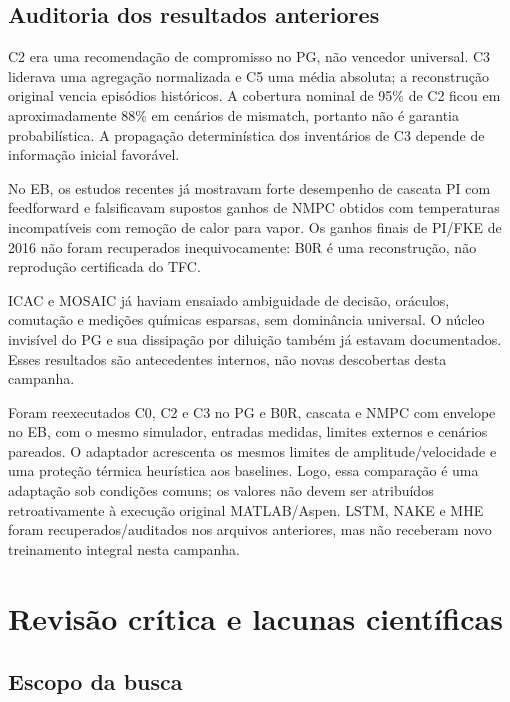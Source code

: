 \documentclass[
  11pt,
  letterpaper,
]{article}
\begin{document}
\hypertarget{auditoria-dos-resultados-anteriores}{%
\subsection{Auditoria dos resultados
anteriores}\label{auditoria-dos-resultados-anteriores}}

C2 era uma recomendação de compromisso no PG, não vencedor universal. C3
liderava uma agregação normalizada e C5 uma média absoluta; a
reconstrução original vencia episódios históricos. A cobertura nominal
de 95\% de C2 ficou em aproximadamente 88\% em cenários de mismatch,
portanto não é garantia probabilística. A propagação determinística dos
inventários de C3 depende de informação inicial favorável.

No EB, os estudos recentes já mostravam forte desempenho de cascata PI
com feedforward e falsificavam supostos ganhos de NMPC obtidos com
temperaturas incompatíveis com remoção de calor para vapor. Os ganhos
finais de PI/FKE de 2016 não foram recuperados inequivocamente: B0R é
uma reconstrução, não reprodução certificada do TFC.

ICAC e MOSAIC já haviam ensaiado ambiguidade de decisão, oráculos,
comutação e medições químicas esparsas, sem dominância universal. O
núcleo invisível do PG e sua dissipação por diluição também já estavam
documentados. Esses resultados são antecedentes internos, não novas
descobertas desta campanha.

Foram reexecutados C0, C2 e C3 no PG e B0R, cascata e NMPC com envelope
no EB, com o mesmo simulador, entradas medidas, limites externos e
cenários pareados. O adaptador acrescenta os mesmos limites de
amplitude/velocidade e uma proteção térmica heurística aos baselines.
Logo, essa comparação é uma adaptação sob condições comuns; os valores
não devem ser atribuídos retroativamente à execução original
MATLAB/Aspen. LSTM, NAKE e MHE foram recuperados/auditados nos arquivos
anteriores, mas não receberam novo treinamento integral nesta campanha.

\hypertarget{revisuxe3o-cruxedtica-e-lacunas-cientuxedficas}{%
\section{Revisão crítica e lacunas
científicas}\label{revisuxe3o-cruxedtica-e-lacunas-cientuxedficas}}

\hypertarget{escopo-da-busca}{%
\subsection{Escopo da busca}\label{escopo-da-busca}}
\end{document}
